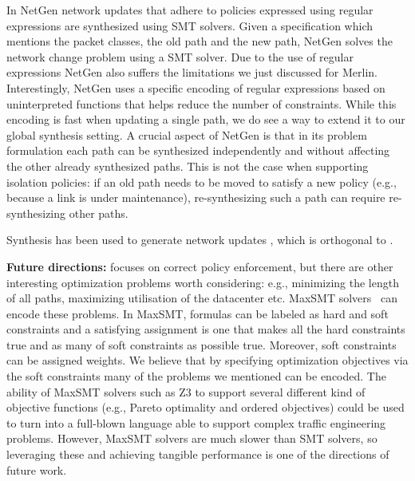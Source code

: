 In NetGen network updates that adhere to policies expressed using
regular expressions are synthesized using SMT solvers.  Given a
specification which mentions the packet classes, the old path and the
new path, NetGen solves the network change problem using a SMT solver.
Due to the use of regular expressions NetGen also suffers the
limitations we just discussed for Merlin.  Interestingly, NetGen uses
a specific encoding of regular expressions based on uninterpreted
functions that helps reduce the number of constraints. While this
encoding is fast when updating a single path, we do see a way to
extend it to our global synthesis setting.  A crucial aspect of NetGen
is that in its problem formulation each path can be synthesized
independently and without affecting the other already synthesized
paths.  This is not the case when supporting isolation policies: if an
old path needs to be moved to satisfy a new policy (e.g., because a
link is under maintenance), re-synthesizing such a path can require
re-synthesizing other paths. 

Synthesis has been used to generate network
updates \cite{updates, customconsistency}, which is orthogonal to \Name.


\noindent
{\bf Future directions:}
\Name focuses on correct policy enforcement, but there are other
interesting optimization problems worth considering: e.g., minimizing
the length of all paths, maximizing utilisation of the datacenter
etc. MaxSMT solvers~\cite{z3maxSMT} can encode these problems.  In
MaxSMT, formulas can be labeled as hard and soft constraints and a
satisfying assignment is one that makes all the hard constraints true
and as many of soft constraints as possible true.  Moreover, soft
constraints can be assigned weights.  We believe that by specifying
optimization objectives via the soft constraints many of the problems
we mentioned can be encoded.  The ability of MaxSMT solvers such as Z3
to support several different kind of objective functions (e.g., Pareto
optimality and ordered objectives) could be used to turn \Name into a
full-blown language able to support complex traffic engineering
problems.  However, MaxSMT solvers are much slower than SMT solvers,
so leveraging these and achieving tangible performance is one of the
directions of future work.
 
